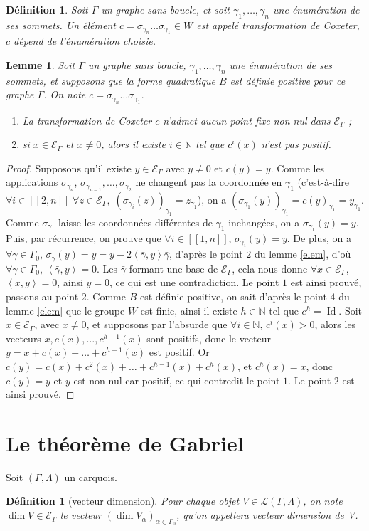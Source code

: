 \documentclass[a4paper,10pt]{article}
\newtheorem{lm}[thm]{Lemme}%
\newtheorem{defi}[thm]{Définition}%
\DeclareMathOperator{\Id}{Id}
\newcommand{\ps}[2]{\left\langle#1,#2\right\rangle}
\newcommand{\EG}{\mathscr{E}_\Gamma}
\newcommand{\ent}[2]{[\![#1,#2]\!]}
\begin{document}
\begin{defi}
	Soit $\Gamma$ un graphe sans boucle, et soit $\gamma_1,\dots,\gamma_n$ une énumération de ses sommets. Un élément $c=\sigma_{\gamma_n}\dots\sigma_{\gamma_1}\in W$ est appelé \emph{transformation de Coxeter}, $c$ dépend de l'énumération choisie.
\end{defi}
\begin{lm}
Soit $\Gamma$ un graphe sans boucle, $\gamma_1,\dots,\gamma_n$ une énumération de ses sommets, et supposons que la forme quadratique $B$ est définie positive pour ce graphe $\Gamma$. On note $c=\sigma_{\gamma_n}\dots\sigma_{\gamma_1}$.
\begin{enumerate}
	\item La transformation de Coxeter $c$ n'admet aucun point fixe non nul dans $\EG$ ;
	\item si $x\in\EG$ et $x\neq0$, alors il existe $i\in\mathbb N$ tel que $c^i(x)$ n'est pas positif.
\end{enumerate}
\end{lm}
\begin{proof}
	Supposons qu'il existe $y\in\EG$ avec $y\neq0$ et $c(y)=y$. Comme les applications $\sigma_{\gamma_n}$, $\sigma_{\gamma_{n-1}},\dots,\sigma_{\gamma_2}$ ne changent pas la coordonnée en $\gamma_1$ (c'est-à-dire $\forall i\in\ent{2}{n}\;\forall z\in\EG,\;(\sigma_{\gamma_i}(z))_{\gamma_1}=z_{\gamma_1}$), on a $(\sigma_{\gamma_1}(y))_{\gamma_1}=c(y)_{\gamma_1}=y_{\gamma_1}$. Comme $\sigma_{\gamma_1}$ laisse les coordonnées différentes de $\gamma_1$ inchangées, on a $\sigma_{\gamma_1}(y)=y$. Puis, par récurrence, on prouve que $\forall i\in\ent{1}{n}$, $\sigma_{\gamma_i}(y)=y$. De plus, on a $\forall\gamma\in\Gamma_0$, $\sigma_{\gamma}(y)=y=y-2\ps{\bar\gamma}{y}\bar\gamma$, d'après le point $2$ du lemme \ref{elem}, d'où $\forall\gamma\in\Gamma_0$, $\ps{\bar\gamma}{y}=0$. Les $\bar\gamma$ formant une base de $\EG$, cela nous donne $\forall x\in\EG$, $\ps{x}{y}=0$, ainsi $y=0$, ce qui est une contradiction. Le point $1$ est ainsi prouvé, passons au point $2$. Comme $B$ est définie positive, on sait d'après le point $4$ du lemme \ref{elem} que le groupe $W$ est finie, ainsi il existe $h\in\mathbb N$ tel que $c^h=\Id$. Soit $x\in\EG$, avec $x\neq0$, et supposons par l'absurde que $\forall i\in\mathbb N$, $c^i(x)>0$, alors les vecteurs $x,c(x),\dots,c^{h-1}(x)$ sont positifs, donc le vecteur $y=x+c(x)+\dots+c^{h-1}(x)$ est positif. Or $c(y)=c(x)+c^2(x)+\dots+c^{h-1}(x)+c^h(x)$, et $c^h(x)=x$, donc $c(y)=y$ et $y$ est non nul car positif, ce qui contredit le point $1$. Le point $2$ est ainsi prouvé.
\end{proof}
\clearpage
\section{Le théorème de Gabriel}
Soit $(\Gamma,\Lambda)$ un carquois.
\begin{defi}[vecteur dimension]
	Pour chaque objet $V\in\mathscr L(\Gamma,\Lambda)$, on note $\dim V\in\EG$ le vecteur $(\dim V_\alpha)_{\alpha\in\Gamma_0}$, qu'on appellera \emph{vecteur dimension} de V.
\end{defi}
\clearpage


\end{document}
